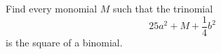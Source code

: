 Find every monomial $M$ such that the trinomial
\[
25a^2+M+\dfrac{1}{4}b^2
\]
is the square of a binomial.
